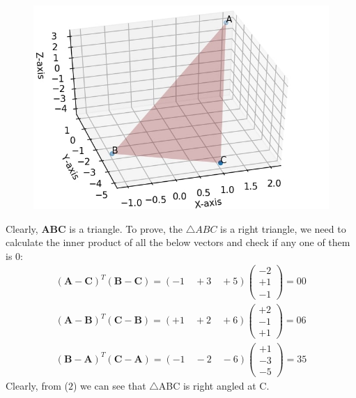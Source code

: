 \documentclass{article}
\newcommand{\myvec}[1]{\ensuremath{\begin{pmatrix}#1\end{pmatrix}}}
\let\vec\mathbf
\begin{document}
\begin{figure}[!htb]
	
	\centering
	
	\includegraphics[width=\columnwidth]{assignment1fig-1.jpg}
	
	\caption{\label{fig1}}
	
	\label{fig:}
	
\end{figure}
Clearly, $\vec{A}\vec{B}\vec{C}$ is a triangle.
To prove, the $\triangle ABC$ is a right triangle, we need to calculate the inner product of all the below vectors and check if any one of them is 0:
\begin{align}
	(\vec{A} -\vec{C})^T (\vec{B}-\vec{C}) = (-1 \quad+3 \quad +5) \myvec{-2 \\ +1 \\ -1}  = 00 \\
	(\vec{A} -\vec{B})^T (\vec{C}-\vec{B})
	 = (+1 \quad +2 \quad +6) \myvec{+2 \\ -1 \\ +1} = 06 \\
    (\vec{B} -\vec{A})^T (\vec{C}-\vec{A}) = (-1\quad-2 \quad-6) \myvec{+1\\-3\\-5} = 35 
\end{align}
Clearly, from ($2$) we can see that $\triangle$ABC is right angled at C.
\end{document}
